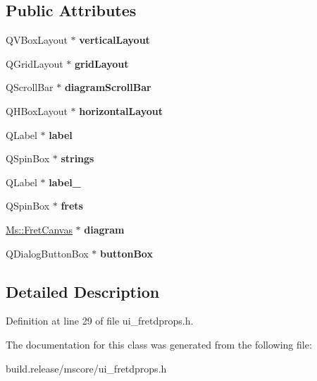 \subsection*{Public Attributes}
\begin{DoxyCompactItemize}
\item 
\mbox{\label{class_ui___fret_diagram_properties_a9df2e0e0cdaec3693b3e03cfbb247774}} 
Q\+V\+Box\+Layout $\ast$ {\bfseries vertical\+Layout}
\item 
\mbox{\label{class_ui___fret_diagram_properties_afdcb33d074ff7d769d20d98fd5e8ed08}} 
Q\+Grid\+Layout $\ast$ {\bfseries grid\+Layout}
\item 
\mbox{\label{class_ui___fret_diagram_properties_a51e3ffecc5b53fbfcd2cf8f6eb4bfe68}} 
Q\+Scroll\+Bar $\ast$ {\bfseries diagram\+Scroll\+Bar}
\item 
\mbox{\label{class_ui___fret_diagram_properties_adba72cfc01fc13b497ddee5abc493194}} 
Q\+H\+Box\+Layout $\ast$ {\bfseries horizontal\+Layout}
\item 
\mbox{\label{class_ui___fret_diagram_properties_abd45a19dfa02cecbeb44eb82b5f3c5b6}} 
Q\+Label $\ast$ {\bfseries label}
\item 
\mbox{\label{class_ui___fret_diagram_properties_a1fcbb07eed644363f28b7f4c85464e48}} 
Q\+Spin\+Box $\ast$ {\bfseries strings}
\item 
\mbox{\label{class_ui___fret_diagram_properties_a6d95a9fa480267ee21d2a1b1e8a3616d}} 
Q\+Label $\ast$ {\bfseries label\+\_}
\item 
\mbox{\label{class_ui___fret_diagram_properties_ae93f664b7bd5181b4dd8a31bfac86959}} 
Q\+Spin\+Box $\ast$ {\bfseries frets}
\item 
\mbox{\label{class_ui___fret_diagram_properties_a6c06c4072a6d478fb7134cc71e1e79da}} 
\hyperlink{class_ms_1_1_fret_canvas}{Ms\+::\+Fret\+Canvas} $\ast$ {\bfseries diagram}
\item 
\mbox{\label{class_ui___fret_diagram_properties_a1ea1eb0df4a5f788f762788966ac13d7}} 
Q\+Dialog\+Button\+Box $\ast$ {\bfseries button\+Box}
\end{DoxyCompactItemize}


\subsection{Detailed Description}


Definition at line 29 of file ui\+\_\+fretdprops.\+h.



The documentation for this class was generated from the following file\+:\begin{DoxyCompactItemize}
\item 
build.\+release/mscore/ui\+\_\+fretdprops.\+h\end{DoxyCompactItemize}
